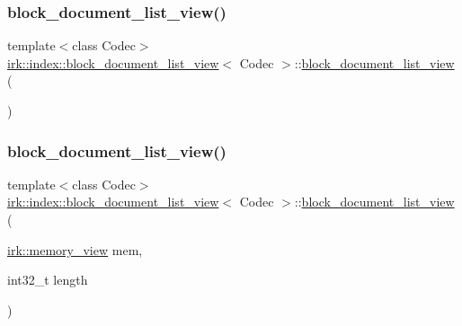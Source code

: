 \subsubsection{\texorpdfstring{block\+\_\+document\+\_\+list\+\_\+view()}{block\_document\_list\_view()}\hspace{0.1cm}{\footnotesize\ttfamily [1/2]}}
{\footnotesize\ttfamily template$<$class Codec$>$ \\
\mbox{\hyperlink{classirk_1_1index_1_1block__document__list__view}{irk\+::index\+::block\+\_\+document\+\_\+list\+\_\+view}}$<$ Codec $>$\+::\mbox{\hyperlink{classirk_1_1index_1_1block__document__list__view}{block\+\_\+document\+\_\+list\+\_\+view}} (\begin{DoxyParamCaption}{ }\end{DoxyParamCaption})\hspace{0.3cm}{\ttfamily [default]}}

\mbox{\label{classirk_1_1index_1_1block__document__list__view_a7618502e688a818d719a9bc939753390}} 
\subsubsection{\texorpdfstring{block\+\_\+document\+\_\+list\+\_\+view()}{block\_document\_list\_view()}\hspace{0.1cm}{\footnotesize\ttfamily [2/2]}}
{\footnotesize\ttfamily template$<$class Codec$>$ \\
\mbox{\hyperlink{classirk_1_1index_1_1block__document__list__view}{irk\+::index\+::block\+\_\+document\+\_\+list\+\_\+view}}$<$ Codec $>$\+::\mbox{\hyperlink{classirk_1_1index_1_1block__document__list__view}{block\+\_\+document\+\_\+list\+\_\+view}} (\begin{DoxyParamCaption}\item[{\mbox{\hyperlink{classirk_1_1memory__view}{irk\+::memory\+\_\+view}}}]{mem,  }\item[{int32\+\_\+t}]{length }\end{DoxyParamCaption})\hspace{0.3cm}{\ttfamily [inline]}}



